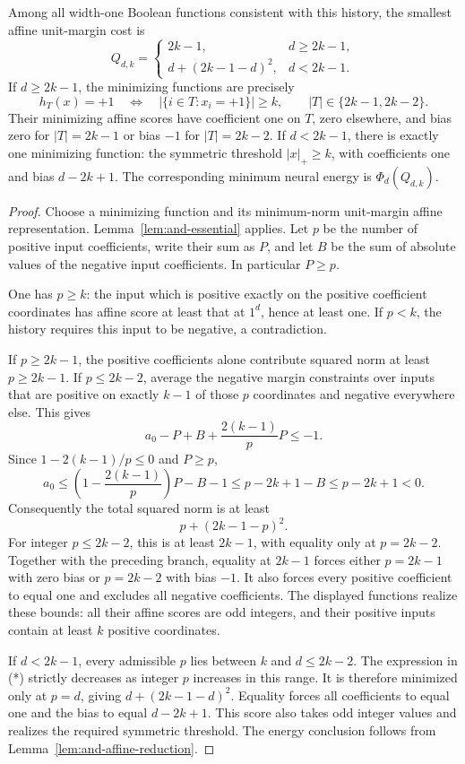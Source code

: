 \begin{proposition}
\label{prop:and-phase-minimizers}
Among all width-one Boolean functions consistent with this history,
the smallest affine unit-margin cost is
\[
 Q_{d,k}=
 \begin{cases}
  2k-1,&d\ge2k-1,\\
  d+(2k-1-d)^2,&d<2k-1.
 \end{cases}
\]
If $d\ge2k-1$, the minimizing functions are precisely
\[
 h_T(x)=+1
 \quad\Longleftrightarrow\quad
 |\{i\in T:x_i=+1\}|\ge k,
 \qquad |T|\in\{2k-1,2k-2\}.
\]
Their minimizing affine scores have coefficient one on $T$, zero
elsewhere, and bias zero for $|T|=2k-1$ or bias $-1$ for $|T|=2k-2$.
If $d<2k-1$, there is exactly one minimizing function: the symmetric
threshold $|x|_+\ge k$, with coefficients one and bias $d-2k+1$.
The corresponding minimum neural energy is $\Phi_d(Q_{d,k})$.
\end{proposition}
\begin{proof}
Choose a minimizing function and its minimum-norm unit-margin affine
representation. Lemma~\ref{lem:and-essential} applies. Let $p$ be the
number of positive input coefficients, write their sum as $P$, and let
$B$ be the sum of absolute values of the negative input coefficients.
In particular $P\ge p$.

One has $p\ge k$: the input which is positive exactly on the positive
coefficient coordinates has affine score at least that at $1^d$, hence
at least one. If $p<k$, the history requires this input to be negative,
a contradiction.

If $p\ge2k-1$, the positive coefficients alone contribute squared norm
at least $p\ge2k-1$. If $p\le2k-2$, average the negative margin
constraints over inputs that are positive on exactly $k-1$ of those
$p$ coordinates and negative everywhere else. This gives
\[
 a_0-P+B+\frac{2(k-1)}pP\le-1.
\]
Since $1-2(k-1)/p\le0$ and $P\ge p$,
\[
 a_0\le\left(1-\frac{2(k-1)}p\right)P-B-1
       \le p-2k+1-B\le p-2k+1<0.
\]
Consequently the total squared norm is at least
\[
 p+(2k-1-p)^2.
\tag{*}
\]
For integer $p\le2k-2$, this is at least $2k-1$, with equality only
at $p=2k-2$. Together with the preceding branch, equality at $2k-1$
forces either $p=2k-1$ with zero bias or $p=2k-2$ with bias $-1$.
It also forces every positive coefficient to equal one and excludes
all negative coefficients. The displayed functions realize these
bounds: all their affine scores are odd integers, and their positive
inputs contain at least $k$ positive coordinates.

If $d<2k-1$, every admissible $p$ lies between $k$ and $d\le2k-2$.
The expression in (*) strictly decreases as integer $p$ increases
in this range. It is therefore minimized only at $p=d$, giving
$d+(2k-1-d)^2$. Equality forces all coefficients to equal one and
the bias to equal $d-2k+1$. This score also takes odd integer values
and realizes the required symmetric threshold. The energy conclusion
follows from Lemma~\ref{lem:and-affine-reduction}.
\end{proof}


